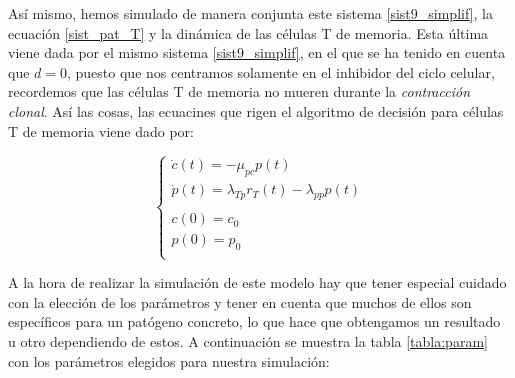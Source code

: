 Así mismo, hemos simulado de manera conjunta este sistema \ref{sist9_simplif}, la ecuación \ref{sist_pat_T} y la dinámica de las células T de memoria. Esta última viene dada por el mismo sistema \ref{sist9_simplif}, en el que se ha tenido en cuenta que $d=0$, puesto que nos centramos solamente en el inhibidor del ciclo celular, recordemos que las células T de memoria no mueren durante la \textit{contracción clonal}. Así las cosas, las ecuacines que rigen el algoritmo de decisión para células T de memoria viene dado por: 

\begin{equation}
	\label{sist15_simplif}
	\left\{ \begin{array}{l}
	\dot{c}(t) = -\mu_{pc}p(t) \\
	\dot{p}(t) = \lambda_{Tp}r_{T}(t) - \lambda_{pp}p(t) \\
	\\
	c(0)=c_0 \\
	p(0)=p_0 \\
	\end{array}
	\right.
\end{equation}


A la hora de realizar la simulación de este modelo hay que tener especial cuidado con la elección de los parámetros y tener en cuenta que muchos de ellos son específicos para un patógeno concreto, lo que hace que obtengamos un resultado u otro dependiendo de estos. A continuación se muestra la tabla \ref{tabla:param} con los parámetros elegidos para nuestra simulación:


